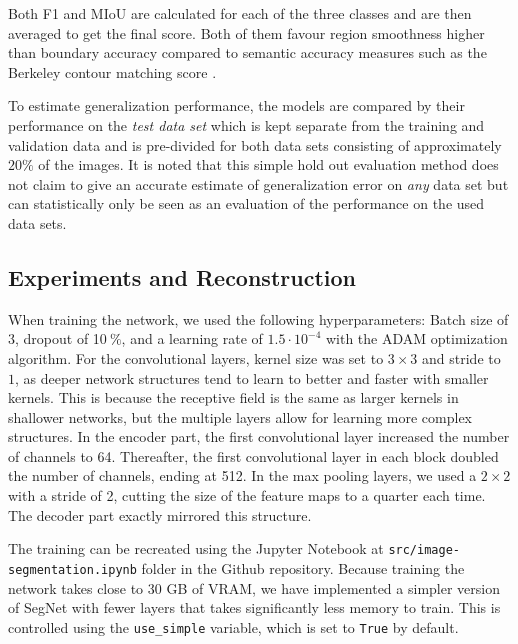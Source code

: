 \documentclass{article}
\newcommand{\pro}{\ensuremath{\ \%}}
\begin{document}
Both F1 and MIoU are calculated for each of the three classes and are then averaged to get the final score. Both of them favour region smoothness higher than boundary accuracy compared to semantic accuracy measures such as the Berkeley contour matching score \cite{seg}.

To estimate generalization performance, the models are compared by their performance on the \textit{test data set} which is kept separate from the training and validation data and is pre-divided for both data sets consisting of approximately \( 20\%\) of the images.  It is noted that this simple hold out evaluation method does not claim to give an accurate estimate of generalization error on \textit{any} data set but can statistically only be seen as an evaluation of the performance on the used data sets. 

\subsection{Experiments and Reconstruction}
When training the network, we used the following hyperparameters: Batch size of 3, dropout of 10\pro, and a learning rate of $ 1.5\cdot 10^{-4} $ with the ADAM optimization algorithm.
For the convolutional layers, kernel size was set to $ 3\times 3 $ and stride to $ 1 $, as deeper network structures tend to learn to better and faster with smaller kernels.
This is because the receptive field is the same as larger kernels in shallower networks, but the multiple layers allow for learning more complex structures.
In the encoder part, the first convolutional layer increased the number of channels to 64.
Thereafter, the first convolutional layer in each block doubled the number of channels, ending at 512.
In the max pooling layers, we used a $ 2\times 2 $ with a stride of 2, cutting the size of the feature maps to a quarter each time.
The decoder part exactly mirrored this structure.

The training can be recreated using the Jupyter Notebook at \texttt{src/image-segmentation.ipynb} folder in the Github repository.
Because training the network takes close to 30 GB of VRAM, we have implemented a simpler version of SegNet with fewer layers that takes significantly less memory to train.
This is controlled using the \texttt{use\_simple} variable, which is set to \texttt{True} by default.
\end{document}
